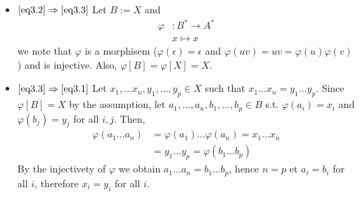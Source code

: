 \documentclass[a4paper,11pt]{exam}
\begin{document}
\begin{questions}
\begin{solution}
\begin{itemize}
		\item $\ref{eq3.2} \Rightarrow \ref{eq3.3}$ Let $B := X$ and
		\begin{align*}
		\varphi &: B^* \to A^*\\
		& x \mapsto x
		\end{align*}
		we note that $\varphi$ is a morphisem ($\varphi(\epsilon) = \epsilon$ and $\varphi(uv) = uv = \varphi(u)\varphi(v)$) and is injective. Also, $\varphi[B] = \varphi[X] = X$.
		
		
		
		\item $\ref{eq3.3} \Rightarrow \ref{eq3.1}$ Let $x_1,\dots x_n,y_1,\dots,y_p \in X$ such that $x_1 \dots x_n = y_1 \dots y_p$. Since $\varphi[B] = X$ by the assumption, let $a_1,\dots, a_n,b_1,\dots, b_p \in B$ s.t. $\varphi(a_i) = x_i$ and $\varphi(b_j) = y_j$ for all $i,j$. Then,
		\begin{align*}
		\varphi(a_1 \dots a_n) & = \varphi(a_1) \dots \varphi(a_n) =  x_1 \dots x_n \\
		& = y_1 \dots y_p = \varphi(b_1 \dots b_p)
		\end{align*}
		By the injectivety of $\varphi$ we obtain $a_1 \dots a_n = b_1 \dots b_p$, hence $n=p$ et $a_i = b_i$ for all $i$, therefore $x_i = y_i$ for all $i$. 
		
		
	\end{itemize}
\end{solution}



\end{questions}
\end{document}
